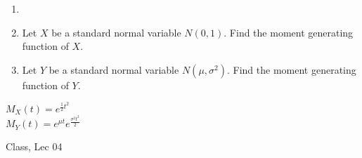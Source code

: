 \begin{samepage}
\begin{ex}
    \begin{enumerate}[label=(\roman*)]
        \item[]
        \item Let $X$ be a standard normal variable $N(0,1)$. Find the moment generating function of $X$.
        \item Let $Y$ be a standard normal variable $N(\mu,\sigma ^2)$. Find the moment generating function of $Y$.
    \end{enumerate}
\end{ex}
\begin{ans}
$M_X(t) = e^{\frac{1}{2} t^2}$ \\
$M_Y(t) = e^{\mu t} e^{\frac{\sigma^2 t^2}{2}}$ 
\end{ans}
\begin{source}
Class, Lec 04
\end{source}
\end{samepage}
